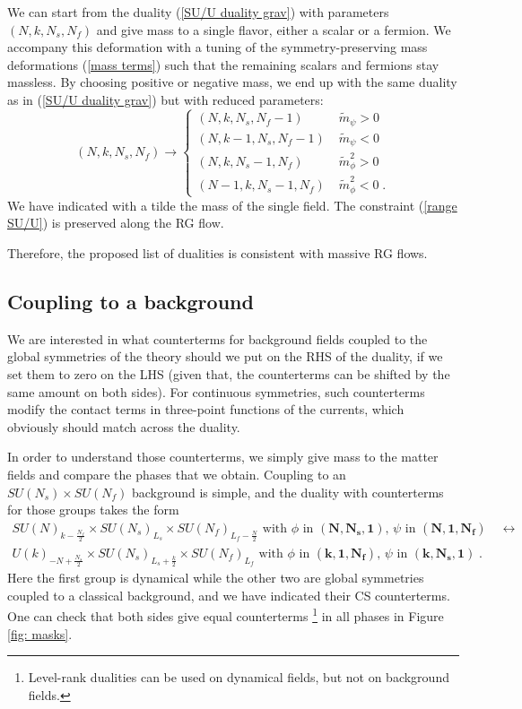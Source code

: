 \documentclass[a4paper, 12pt]{article}
\newcommand{\rep}[1]{\ensuremath{\mathbf{#1}}}
\newcommand{\wt}{\widetilde}
\numberwithin{equation}{section}
\newcommand{\be}{\begin{equation}} \newcommand{\ee}{\end{equation}}
\begin{document}
We can start from the duality (\ref{SU/U duality grav}) with parameters $(N,k,N_s,N_f)$ and give mass to a single flavor, either a scalar or a fermion. We accompany this deformation with a tuning of the symmetry-preserving mass deformations (\ref{mass terms}) such that the remaining scalars and fermions stay massless. By choosing positive or negative mass, we end up with the same duality as in (\ref{SU/U duality grav}) but with reduced parameters:
\be
\label{RG flow pattern}
(N,k,N_s,N_f) \to \begin{cases} (N,k, N_s, N_f-1) \qquad & \wt m_\psi>0 \\ (N,k-1,N_s, N_f-1) & \wt m_\psi<0 \\ (N,k,N_s-1,N_f) & \wt m_\phi^2>0 \\ (N-1, k, N_s-1,N_f) & \wt m_\phi^2<0 \;. \end{cases}
\ee
We have indicated with a tilde the mass of the single field. The constraint (\ref{range SU/U}) is preserved along the RG flow.

Therefore, the proposed list of dualities is consistent with massive RG flows.








\subsection{Coupling to a background}
\label{sec: SU/U coupling to background}

We are interested in what counterterms for background fields coupled to the global symmetries of the theory should we put on the RHS of the duality, if we set them to zero on the LHS (given that, the counterterms can be shifted by the same amount on both sides). For continuous symmetries, such counterterms modify the contact terms in three-point functions of the currents, which obviously should match across the duality.

In order to understand those counterterms, we simply give mass to the matter fields and compare the phases that we obtain. Coupling to an $SU(N_s) \times SU(N_f)$ background is simple, and the duality with counterterms for those groups takes the form
\begin{multline}
\label{SU/U duality with SU background}
SU(N)_{k - \frac{N_f}2} \times SU(N_s)_{L_s} \times SU(N_f)_{L_f - \frac N2} \text{ with $\phi$ in $(\rep{N}, \rep{N_s}, \rep1)$, $\psi$ in $(\rep{N}, \rep1, \rep{N_f})$} \quad\longleftrightarrow \\
U(k)_{-N + \frac{N_s}2} \times SU(N_s)_{L_s + \frac k2} \times SU(N_f)_{L_f} \text{ with $\phi$ in $(\rep{k}, \rep1, \rep{N_f})$, $\psi$ in $(\rep{k}, \rep{N_s}, \rep1)$} \;.
\end{multline}
Here the first group is dynamical while the other two are global symmetries coupled to a classical background, and we have indicated their CS counterterms. One can check that both sides give equal counterterms%
\footnote{Level-rank dualities can be used on dynamical fields, but not on background fields.}
in all phases in Figure \ref{fig: masks}.
\end{document}
